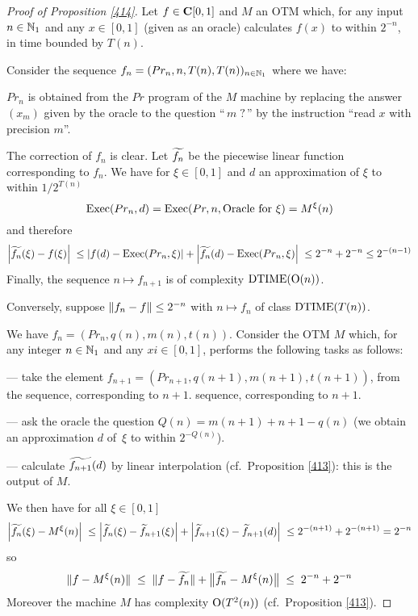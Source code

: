 \begin{proof}[Proof of Proposition \ref{414}] Let $f \in {{\bf C}[0,1]}$ and $M$ an OTM which, for any input $n \in \mathbb {N}_1$ and any $x \in [0,1]$ (given as an oracle) calculates $f(x)$ to within $2^{-n}$, in time bounded by $T(n)$. 

\noindent 
Consider the sequence $f_n = (Pr_n, n, T(n), T(n))_{n \in \mathbb {N}_1}$ where we have:

\noindent 
$Pr_n$ is obtained from the $Pr$ program of the $M$ machine by replacing the answer $(x_m)$ given by the oracle to the question ``$\,m\;?\,$'' by the instruction ``read $x$ with precision $m$''. 

\noindent 
The correction of $f_n$ is clear. 
Let $\widetilde{f_n}$ be the piecewise linear function corresponding to $f_n$. 
We have for $\xi \in [0,1]$ and $d$ an approximation of $\xi$ to within $1/2^{T(n)}$
\[ 
{{\rm Exec}}(Pr_n, d) = {{\rm Exec}} (Pr, n, \hbox{Oracle  for } \xi) = M^{\xi}(n)
\]
and therefore
\[
\left|{\widetilde{f_n}(\xi) - f(\xi)}\right|\; \leq 
\left|{f(d) - {{\rm Exec}}(Pr_n, \xi)}\right| + 
\left|{\widetilde{f_n}(d) - {{\rm Exec}} (Pr_n, \xi) }\right|
\; \leq 2^{-n} + 2^{-n} \leq 2^{-(n-1)}
\] 
Finally, the sequence $n \mapsto f_{n+1}$ is of complexity ${\rm DTIME} ({\rm O}(n))$.

\noindent 
Conversely, suppose $\lVert  f_n - f  \rVert \leq 2^{-n}$ with 
$n \mapsto f_n$ of class ${\rm DTIME} (T(n))$. 

\noindent 
We have $f_n = (Pr_n, q(n), m(n), t(n))$. Consider the OTM $M$ which, for any integer $n \in \mathbb {N}_1$ and any $xi \in [0,1]$, performs the following tasks 
as follows: 

\noindent 
--- take the element $f_{n+1} = (Pr_{n+1}, q(n+1), m(n+1), t(n+1))$, from the sequence, corresponding to $n+1$. 
sequence, corresponding to $n+1$. 

\noindent 
--- ask the oracle the question $Q(n) = m(n+1) + n+1 - q(n)$ (we obtain 
an approximation $d$ of~$\xi$ to within $2^{-Q(n)}$). 

\noindent 
--- calculate $\widetilde{f_{n+1}}(d)$ by linear interpolation (cf.\ Proposition \ref{413}): this is the output of $M$.

\noindent 
We then have for all $\xi \in [0,1]$
\[
\left|{\widetilde{f_n}(\xi) - M^{\xi}(n)}\right| \; \leq 
\left|{\widetilde{f}_n(\xi) - \widetilde{f}_{n+1}(\xi)}\right| + 
\left|{\widetilde{f}_{n+1}(\xi) - \widetilde{f}_{n+1}(d)}\right|\; \leq 2^{-(n+1)} + 2^{-(n+1)} = 2^{-n}  
\]
so 
\[
\lVert  f - M^{\xi}(n)  \rVert \; \leq\; \lVert  f - \widetilde{f_n}  \rVert + \big\lVert  \widetilde{f_n} - M^{\xi}(n)  \big\rVert \; \leq\; 2^{-n} + 2^{-n}
\]
Moreover the machine $M$ has complexity ${\rm O}(T^2(n))$ (cf.\ Proposition \ref{413}). 
\end{proof}


